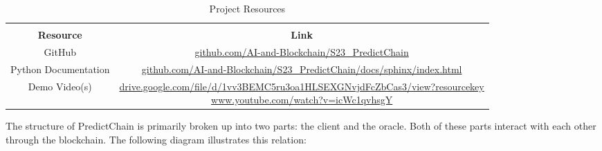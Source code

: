 \documentclass{article}
\begin{document}
    \begin{table}[H]
        \begin{center}
            \caption{{Project Resources}}
            \label{tab:resources}
            \bgroup
            \def\arraystretch{1.2}
            \begin{tabular}{|c|c|}
                \hline\\
                \textbf{Resource} & \textbf{Link}\\
                \hline
                GitHub & \href{https://github.com/AI-and-Blockchain/S23_PredictChain}{github.com/AI-and-Blockchain/S23\_PredictChain}\\
                \hline
                Python Documentation & \href{https://github.com/AI-and-Blockchain/S23_PredictChain/docs/sphinx/index.html}{github.com/AI-and-Blockchain/S23\_PredictChain/docs/sphinx/index.html}\\
                \hline
                Demo Video(s) & \makecell{
                    \href{https://drive.google.com/file/d/1vv3BEMC5ru3oa1HLSEXGNvjdFcZbCas3/view?resourcekey}{drive.google.com/file/d/1vv3BEMC5ru3oa1HLSEXGNvjdFcZbCas3/view?resourcekey}\\
                    \href{https://www.youtube.com/watch?v=icWc1qvhsgY}{www.youtube.com/watch?v=icWc1qvhsgY}}\\
                \hline
            \end{tabular}
            \egroup
        \end{center}
    \end{table}


    The structure of PredictChain is primarily broken up into two parts: the client and the oracle.  Both of these parts
    interact with each other through the blockchain.  The following diagram illustrates this relation:
\end{document}

